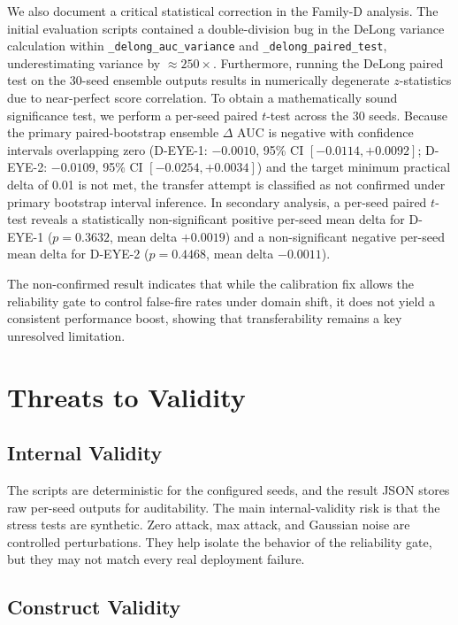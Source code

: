 \documentclass[11pt]{article}
\begin{document}
We also document a critical statistical correction in the Family-D analysis. The initial evaluation scripts contained a double-division bug in the DeLong variance calculation within \texttt{\_delong\_auc\_variance} and \texttt{\_delong\_paired\_test}, underestimating variance by $\approx 250\times$. Furthermore, running the DeLong paired test on the 30-seed ensemble outputs results in numerically degenerate $z$-statistics due to near-perfect score correlation. To obtain a mathematically sound significance test, we perform a per-seed paired $t$-test across the 30 seeds. Because the primary paired-bootstrap ensemble $\Delta$ AUC is negative with confidence intervals overlapping zero (D-EYE-1: $-0.0010$, 95\% CI $[-0.0114, +0.0092]$; D-EYE-2: $-0.0109$, 95\% CI $[-0.0254, +0.0034]$) and the target minimum practical delta of 0.01 is not met, the transfer attempt is classified as not confirmed under primary bootstrap interval inference. In secondary analysis, a per-seed paired $t$-test reveals a statistically non-significant positive per-seed mean delta for D-EYE-1 ($p = 0.3632$, mean delta $+0.0019$) and a non-significant negative per-seed mean delta for D-EYE-2 ($p = 0.4468$, mean delta $-0.0011$).

The non-confirmed result indicates that while the calibration fix allows the reliability gate to control false-fire rates under domain shift, it does not yield a consistent performance boost, showing that transferability remains a key unresolved limitation.

\section{Threats to Validity}

\subsection{Internal Validity}

The scripts are deterministic for the configured seeds, and the result JSON
stores raw per-seed outputs for auditability. The main internal-validity risk is
that the stress tests are synthetic. Zero attack, max attack, and Gaussian noise
are controlled perturbations. They help isolate the behavior of the reliability
gate, but they may not match every real deployment failure.

\subsection{Construct Validity}
\end{document}

